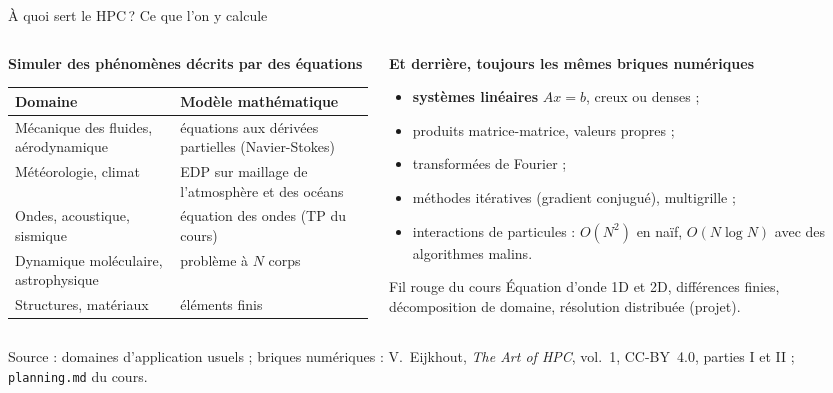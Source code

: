 \documentclass[8pt,aspectratio=169]{beamer}
\newcommand{\src}[1]{\vfill{\tiny\color{gray}Source : #1\par}}
\newcommand{\eij}{V.~Eijkhout, \emph{The Art of HPC}, vol.~1, CC-BY~4.0}
\begin{document}
\begin{frame}{À quoi sert le HPC\,? Ce que l'on y calcule}
\begin{columns}[T]
\begin{column}{0.5\textwidth}
\textbf{Simuler des phénomènes décrits par des équations}

\smallskip
\begin{tabular}{@{}L{3.3cm}L{4.1cm}@{}}
\toprule
Domaine & Modèle mathématique\\
\midrule
Mécanique des fluides, aérodynamique & équations aux dérivées partielles (Navier-Stokes)\\
Météorologie, climat & EDP sur maillage de l'atmosphère et des océans\\
Ondes, acoustique, sismique & équation des ondes (TP du cours)\\
Dynamique moléculaire, astrophysique & problème à $N$ corps\\
Structures, matériaux & éléments finis\\
\bottomrule
\end{tabular}
\end{column}
\begin{column}{0.46\textwidth}
\textbf{Et derrière, toujours les mêmes briques numériques}
\begin{itemize}
\item \textbf{systèmes linéaires} $Ax=b$, creux ou denses ;
\item produits matrice-matrice, valeurs propres ;
\item transformées de Fourier ;
\item méthodes itératives (gradient conjugué), multigrille ;
\item interactions de particules : $O(N^2)$ en naïf, $O(N\log N)$ avec des algorithmes malins.
\end{itemize}

\medskip
\begin{exampleblock}{Fil rouge du cours}
Équation d'onde 1D et 2D, différences finies, décomposition de domaine, résolution distribuée (projet).
\end{exampleblock}
\end{column}
\end{columns}
\src{domaines d'application usuels ; briques numériques : \eij{}, parties I et II ; \texttt{planning.md} du cours.}
\end{frame}
\end{document}
